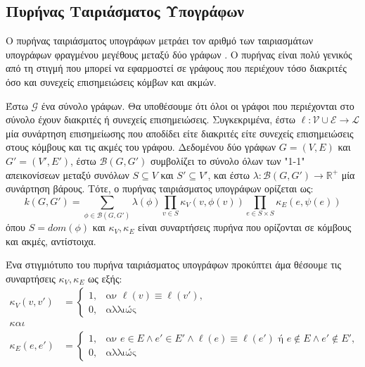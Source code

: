 \subsection{Πυρήνας Ταιριάσματος Υπογράφων}
\label{ssec:sm}
Ο πυρήνας ταιριάσματος υπογράφων μετράει τον αριθμό των ταιριασμάτων υπογράφων φραγμένου μεγέθους μεταξύ δύο γράφων \cite{Kriege2012SubgraphMK}.
Ο πυρήνας είναι πολύ γενικός από τη στιγμή που μπορεί να εφαρμοστεί σε γράφους που περιέχουν τόσο διακριτές όσο και συνεχείς επισημειώσεις κόμβων και ακμών.\par
Έστω $\mathcal{G}$ ένα σύνολο γράφων.
Θα υποθέσουμε ότι όλοι οι γράφοι που περιέχονται στο σύνολο έχουν διακριτές ή συνεχείς επισημειώσεις.
Συγκεκριμένα, έστω $\ell : \mathcal{V} \cup \mathcal{E} \rightarrow \mathcal{L}$ μία συνάρτηση επισημείωσης που αποδίδει είτε διακριτές είτε συνεχείς επισημειώσεις στους κόμβους και τις ακμές του γράφου.
Δεδομένου δύο γράφων $G=(V,E)$ και $G'=(V',E')$, έστω $\mathcal{B}(G,G')$ συμβολίζει το σύνολο όλων των "1-1" απεικονίσεων μεταξύ συνόλων $S \subseteq V$ και $S' \subseteq V'$, και έστω $\lambda : \mathcal{B}(G,G') \rightarrow \mathbb{R}^+$ μία συνάρτηση βάρους.
Τότε, ο πυρήνας ταιριάσματος υπογράφων ορίζεται ως:
\begin{equation}
    k(G, G') = \sum_{\phi \in \mathcal{B}(G,G')} \lambda(\phi) \prod_{v \in S} \kappa_V(v, \phi(v)) \prod_{e \in S \times S} \kappa_E(e, \psi(e))
\end{equation}
όπου $S = dom(\phi)$ και $\kappa_V, \kappa_E$ είναι συναρτήσεις πυρήνα που ορίζονται σε κόμβους και ακμές, αντίστοιχα.\par
Ένα στιγμιότυπο του πυρήνα ταιριάσματος υπογράφων προκύπτει άμα θέσουμε τις συναρτήσεις $\kappa_V, \kappa_E$ ως εξής:
\begin{equation}
    \begin{split}
        \kappa_V(v,v') &= \begin{cases}
        1, & \text{αν $\ell(v) \equiv \ell(v')$},\\
        0, & \text{αλλιώς} 
        \end{cases}\\
        και\\
        \kappa_E(e,e') &= \begin{cases}
        1, & \text{αν $e \in E \wedge e' \in E' \wedge \ell(e) \equiv \ell(e')$ ή $e \not \in E \wedge e' \not \in E'$},\\
        0, & \text{αλλιώς}
        \end{cases}
    \end{split}
\end{equation}
